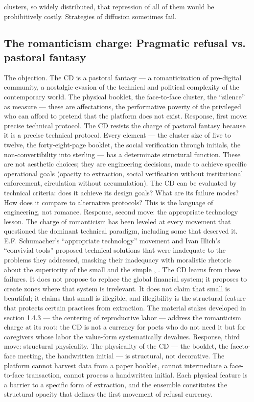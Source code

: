clusters, so widely distributed, that repression of all of them would be prohibitively costly. Strategies of diffusion sometimes fail.

\subsection{The romanticism charge: Pragmatic refusal vs. pastoral fantasy}

The objection. The CD is a pastoral fantasy — a romanticization of pre-digital community, a nostalgic evasion of the technical and political complexity of the contemporary world. The physical booklet, the face-to-face cluster, the “silence” as measure — these are affectations, the performative poverty of the privileged who can afford to pretend that the platform does not exist. Response, first move: precise technical protocol. The CD resists the charge of pastoral fantasy because it is a precise technical protocol. Every element — the cluster size of five to twelve, the forty-eight-page booklet, the social verification through initials, the non-convertibility into sterling — has a determinate structural function. These are not aesthetic choices; they are engineering decisions, made to achieve specific operational goals (opacity to extraction, social verification without institutional enforcement, circulation without accumulation). The CD can be evaluated by technical criteria: does it achieve its design goals? What are its failure modes? How does it compare to alternative protocols? This is the language of engineering, not romance. Response, second move: the appropriate technology lesson. The charge of romanticism has been leveled at every movement that questioned the dominant technical paradigm, including some that deserved it. E.F. Schumacher’s “appropriate technology” movement and Ivan Illich’s “convivial tools” proposed technical solutions that were inadequate to the problems they addressed, masking their inadequacy with moralistic rhetoric about the superiority of the small and the simple \cite{schumacher_1973}, \cite{illich_1973}. The CD learns from these failures. It does not propose to replace the global financial system; it proposes to create zones where that system is irrelevant. It does not claim that small is beautiful; it claims that small is illegible, and illegibility is the structural feature that protects certain practices from extraction. The material stakes developed in section 1.4.3 — the centering of reproductive labor — address the romanticism charge at its root: the CD is not a currency for poets who do not need it but for caregivers whose labor the value-form systematically devalues. Response, third move: structural physicality. The physicality of the CD — the booklet, the faceto-face meeting, the handwritten initial — is structural, not decorative. The platform cannot harvest data from a paper booklet, cannot intermediate a face-to-face transaction, cannot process a handwritten initial. Each physical feature is a barrier to a specific form of extraction, and the ensemble constitutes the structural opacity that defines the first movement of refusal currency.

